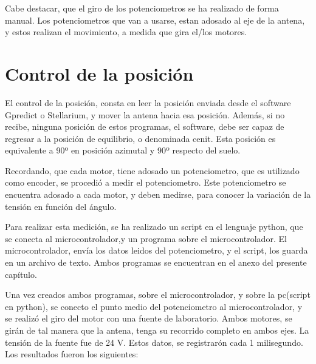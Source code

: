 Cabe destacar, que el giro de los potenciometros se ha realizado de forma manual. Los potenciometros que van a usarse, estan adosado al eje de la antena, y estos realizan el movimiento, a medida que gira el/los motores.  

\section{Control de la posición}
El control de la posición, consta en leer la posición enviada desde el software Gpredict o Stellarium, y mover la antena hacia esa posición. Además, si no recibe, ninguna posición de estos programas, el software, debe ser capaz de regresar a la posición de equilibrio, o denominada cenit. Esta posición es equivalente a 90º en posición azimutal y 90º respecto del suelo. 

Recordando, que cada motor, tiene adosado un potenciometro, que es utilizado como encoder, se procedió a medir el potenciometro. Este potenciometro se encuentra adosado a cada motor, y deben medirse, para conocer la variación de la tensión en función del ángulo. 

Para realizar esta medición, se ha realizado un script en el lenguaje python, que se conecta al microcontrolador,y un programa sobre el microcontrolador. El microcontrolador, envía los datos leidos del potenciometro, y el script, los guarda en un archivo de texto. Ambos programas se encuentran en el anexo del presente capítulo.

Una vez creados ambos programas, sobre el microcontrolador, y sobre la pc(script en python), se conecto el punto medio del potenciometro al microcontrolador, y se realizó el giro del motor con una fuente de laboratorio. Ambos motores, se girán de tal manera que la antena, tenga su recorrido completo en ambos ejes. La tensión de la fuente fue de 24 V. Estos datos, se registrarón cada 1 milisegundo. Los resultados fueron los siguientes: 


